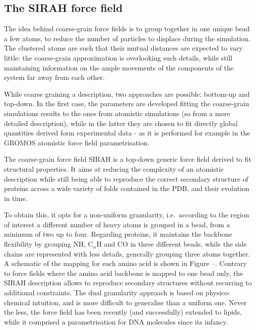 \subsection{The SIRAH force field}
The idea behind coarse-grain force fields is to group together in one unique bead a few atoms, to reduce the number of particles to displace during the simulation. The clustered atoms are such that their mutual distances are expected to vary little: the coarse-grain approximation is overlooking such details, while still maintaining information on the ample movements of the components of the system far away from each other.

While coarse graining a description, two approaches are possible: bottom-up and top-down. In the first case, the parameters are developed fitting the coarse-grain simulations results to the ones from atomistic simulations (so from a more detailed description), while in the latter they are chosen to fit directly global quantities derived form experimental data - as it is performed for example in the GROMOS atomistic force field parametrisation.

The coarse-grain force field SIRAH \cite{Machado2018,Barrera2019} is a top-down generic force field derived to fit structural properties. It aims at reducing the complexity of an atomistic description while still being able to reproduce the correct secondary structure of proteins across a wide variety of folds contained in the PDB, and their evolution in time.

To obtain this, it opts for a non-uniform granularity, i.e.\ according to the region of interest a different number of heavy atoms is grouped in a bead, from a minimum of two up to four. Regarding proteins, it maintains the backbone flexibility by grouping NH, C$_\alpha$H and CO in three different beads, while the side chains are represented with less details, generally grouping three atoms together. A schematic of the mapping for each amino acid is shown in Figure --. Contrary to force fields where the amino acid backbone is mapped to one bead only, the SIRAH description allows to reproduce secondary structures without recurring to additional constraints.
%
The dual granularity approach is based on physico-chemical intuition, and is more difficult to generalise than a uniform one. Never the less, the force field has been recently (and successfully) extended to lipids, while it comprised a parametrisation for DNA molecules since its infancy.

